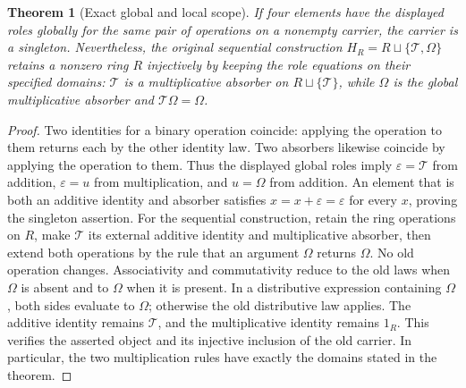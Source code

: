 \documentclass[11pt]{article}
\newtheorem{theorem}{Theorem}
\begin{document}
\begin{theorem}[Exact global and local scope]
If four elements have the displayed roles globally for the same pair of operations on a nonempty carrier, the carrier is a singleton. Nevertheless, the original sequential construction $H_R=R\sqcup\{\mathcal T,\Omega\}$ retains a nonzero ring $R$ injectively by keeping the role equations on their specified domains: $\mathcal T$ is a multiplicative absorber on $R\sqcup\{\mathcal T\}$, while $\Omega$ is the global multiplicative absorber and $\mathcal T\Omega=\Omega$.
\end{theorem}
\begin{proof}
Two identities for a binary operation coincide: applying the operation to them returns each by the other identity law. Two absorbers likewise coincide by applying the operation to them. Thus the displayed global roles imply $\varepsilon=\mathcal T$ from addition, $\varepsilon=u$ from multiplication, and $u=\Omega$ from addition. An element that is both an additive identity and absorber satisfies $x=x+\varepsilon=\varepsilon$ for every $x$, proving the singleton assertion.
For the sequential construction, retain the ring operations on $R$, make $\mathcal T$ its external additive identity and multiplicative absorber, then extend both operations by the rule that an argument $\Omega$ returns $\Omega$. No old operation changes. Associativity and commutativity reduce to the old laws when $\Omega$ is absent and to $\Omega$ when it is present. In a distributive expression containing $\Omega$, both sides evaluate to $\Omega$; otherwise the old distributive law applies. The additive identity remains $\mathcal T$, and the multiplicative identity remains $1_R$. This verifies the asserted object and its injective inclusion of the old carrier. In particular, the two multiplication rules have exactly the domains stated in the theorem.
\end{proof}
\end{document}
